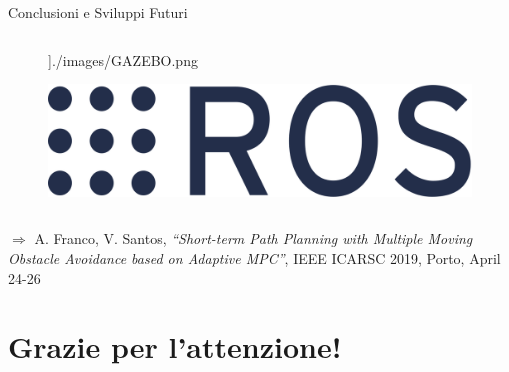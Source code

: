 \documentclass{beamer}
\begin{document}
\begin{frame}{Conclusioni e Sviluppi Futuri}
\begin{columns}[onlytextwidth,T]
\begin{column}[c]{0.20\textwidth}
\begin{figure}
					\textwidth]{./images/GAZEBO.png}
				\end{figure}
				\begin{figure}
					\vspace{-3em}
					\includegraphics[width=
					\textwidth]{./images/ROS.png}
				\end{figure}
			\end{column}			
		\end{columns}
		\vspace{1em}
		$\Longrightarrow$ A. Franco, 
		V. Santos, {\itshape ``Short-term Path Planning with Multiple Moving Obstacle Avoidance based on Adaptive MPC''}, IEEE ICARSC 2019, Porto, April 24-26
	\end{frame}

	\section{Grazie per l'attenzione! \qquad{}}
\end{document}
